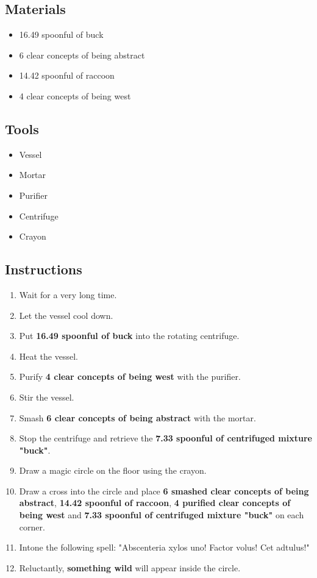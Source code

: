 \documentclass{article}
\begin{document}
\subsection{Materials}\begin{itemize}
\item 
16.49 spoonful of buck
\item 
6 clear concepts of being abstract
\item 
14.42 spoonful of raccoon
\item 
4 clear concepts of being west
\end{itemize}
\subsection{Tools}\begin{itemize}
\item 
Vessel
\item 
Mortar
\item 
Purifier
\item 
Centrifuge
\item 
Crayon
\end{itemize}
\subsection{Instructions}\begin{enumerate}
\item 
Wait for a very long time.
\item 
Let the vessel cool down.
\item 
Put \textbf{16.49 spoonful of buck} into the rotating centrifuge.
\item 
Heat the vessel.
\item 
Purify \textbf{4 clear concepts of being west} with the purifier.
\item 
Stir the vessel.
\item 
Smash \textbf{6 clear concepts of being abstract} with the mortar.
\item 
Stop the centrifuge and retrieve the \textbf{7.33 spoonful of centrifuged mixture "buck"}.
\item 
Draw a magic circle on the floor using the crayon.
\item 
Draw a cross into the circle and place \textbf{6 smashed clear concepts of being abstract}, \textbf{14.42 spoonful of raccoon}, \textbf{4 purified clear concepts of being west} and \textbf{7.33 spoonful of centrifuged mixture "buck"} on each corner.
\item 
Intone the following spell: "Abscenteria xylos uno! Factor volus! Cet adtulus!"
\item 
Reluctantly, \textbf{something wild} will appear inside the circle.
\end{enumerate}
\newpage
\end{document}
